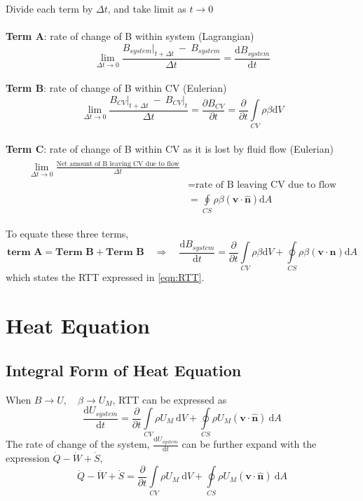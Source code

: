\documentclass[12pt, a4paper]{article}
\begin{document}
\begin{tcolorbox}[breakable, title = Derivation]
 Divide each term by $\Delta t$, and take limit as $t \to 0$\\
\\ \textbf{Term A}: rate of change of B within system (Lagrangian)
 \[ 
 \lim_{\Delta t \to 0}\frac{B_{system} \lvert_{t + \Delta t} \ -\ B_{system}}{\Delta t} = \frac{\mathrm{d}B_{system}}{\mathrm{d}t} 
 \]
\\ 
\textbf{Term B}: rate of change of B within CV (Eulerian)
\[ 
 \lim_{\Delta t \to 0} \frac{B_{CV} \lvert_{t + \Delta t} \ -\  B_{CV}  \lvert_{t}}{\Delta t} = \frac{\partial B_{CV}}{\partial t} = \frac{\partial}{\partial t} \int\limits_{CV} \rho \beta \mathrm{d}V
\]
 \\ 
\textbf{Term C}: rate of change of B within CV as it is lost by fluid flow (Eulerian)
\begin{align*} 
\begin{split}
    \lim_{\Delta t \to 0} \frac{\text{Net amount of B leaving CV due to flow}}{\Delta t} \\
    & = \text{rate of B leaving CV due to flow}\\
    & = \oint\limits_{CS} \rho \beta (\bm{v} \cdot \bm{\hat{n}})\mathrm{d}A 
\end{split}
\end{align*}

To equate these three terms,
\[
    \textbf{term A} = \textbf{Term B} + \textbf{Term B}
    \quad \Rightarrow \quad
    \frac{\mathrm{d}B_{system}}{\mathrm{d}t} 
    = \frac{\partial}{\partial t} \int\limits_{CV} \rho \beta \mathrm{d}V 
    + \oint\limits_{CS} \rho \beta (\bm{v} \cdot \bm{n})\mathrm{d}A 
\]
which states the RTT expressed in \autoref{eqn:RTT}.
\end{tcolorbox}


\newpage
\section{Heat Equation}
\subsection{Integral Form of Heat Equation}
When $B \to U, \quad \beta \to U_{M}$, RTT can be expressed as
\[
    \frac{\mathrm{d}U_{system}}{\mathrm{d}t} = \frac{\partial}{\partial t} \int\limits_{CV} \rho U_{M} \ \mathrm{d}V +  \oint\limits_{CS} \rho U_{M} (\bm{v} \cdot \bm{\hat{n}}) \ \mathrm{d}A
\]
The rate of change of the system, $\frac{\mathrm{d}U_{system}}{\mathrm{d}t}$ can be further expand with the expression $\dot{Q}-\dot{W}+\dot{S}$,
\[
  \dot{Q}-\dot{W}+\dot{S} = \frac{\partial}{\partial t} \int\limits_{CV} \rho U_{M} \ \mathrm{d}V +  \oint\limits_{CS} \rho U_{M} (\bm{v} \cdot \bm{\hat{n}}) \ \mathrm{d}A
\]
\end{document}
